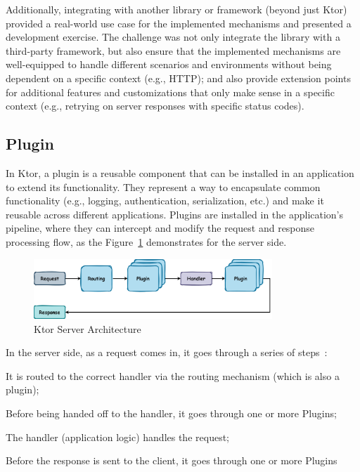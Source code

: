 Additionally, integrating with another library or framework (beyond just Ktor) provided a real-world use case for the implemented mechanisms and presented a development exercise.
The challenge was not only integrate the library with a third-party framework, but also ensure that the implemented mechanisms are well-equipped to handle different scenarios and environments without being dependent on a specific context (e.g., HTTP); and also provide extension points for additional features and customizations that only make sense in a specific context (e.g., retrying on server responses with specific status codes).

\subsection{Plugin}\label{subsec:plugin}

In Ktor, a plugin is a reusable component that can be installed in an application to extend its functionality.
They represent a way to encapsulate common functionality (e.g., logging, authentication, serialization, etc.) and make it reusable across different applications.
Plugins are installed in the application's pipeline, where they can intercept and modify the request and response processing flow, as the Figure~\ref{fig:ktor-server-architecture} demonstrates for the server side.

\begin{figure}[!htb]
    \centering
    \includegraphics[width=0.8\textwidth]{../figures/03_ktor-server-architecture}
    \caption{Ktor Server Architecture}
    \label{fig:ktor-server-architecture}
\end{figure}

In the server side, as a request comes in, it goes through a series of steps~\cite{ktor-server-plugins}:

\begin{boldenumerate}
    \item It is routed to the correct handler via the routing mechanism (which is also a plugin);
    \item Before being handed off to the handler, it goes through one or more Plugins;
    \item The handler (application logic) handles the request;
    \item Before the response is sent to the client, it goes through one or more Plugins
\end{boldenumerate}

